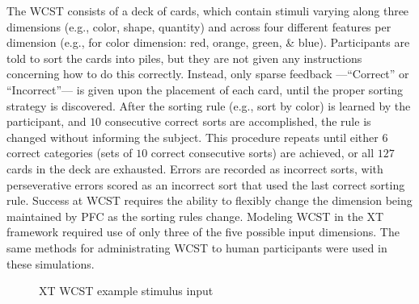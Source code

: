 The WCST consists of a deck of cards, which contain stimuli varying along three dimensions (e.g., color, shape, quantity) and across four different features per dimension (e.g., for color dimension: red, orange, green, \& blue).  Participants are told to sort the cards into piles, but they are not given any instructions concerning how to do this correctly.  Instead, only sparse feedback ---``Correct'' or ``Incorrect''--- is given upon the placement of each card, until the proper sorting strategy is discovered.  After the sorting rule (e.g., sort by color) is learned by the participant, and $10$ consecutive correct sorts are accomplished, the rule is changed without informing the subject.  This procedure repeats until either $6$ correct categories (sets of $10$ correct consecutive sorts) are achieved, or all $127$ cards in the deck are exhausted.  Errors are recorded as incorrect sorts, with perseverative errors scored as an incorrect sort that used the last correct sorting rule.  Success at WCST requires the ability to flexibly change the dimension being maintained by PFC as the sorting rules change.  Modeling WCST in the XT framework required use of only three of the five possible input dimensions.  The same methods for administrating WCST to human participants were used in these simulations.

\begin{figure}
  \begin{center}
  \end{center}
  \caption{XT WCST example stimulus input}
  \label{xt_wcst_stim}
\end{figure}

